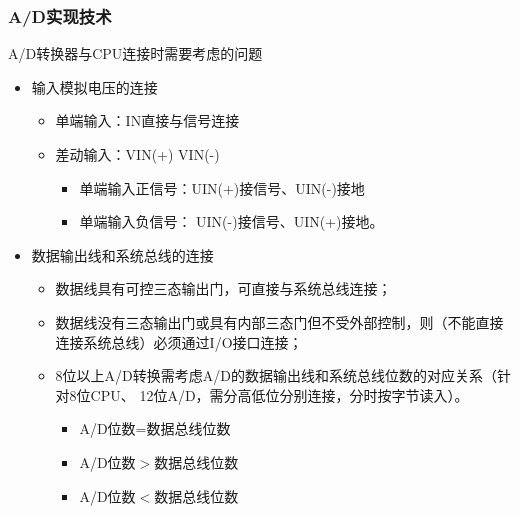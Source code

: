 \subsubsection{A/D实现技术}

A/D转换器与CPU连接时需要考虑的问题

\begin{itemize}
  \item 输入模拟电压的连接
  \begin{itemize}
    \item 单端输入：IN直接与信号连接
    \item 差动输入：VIN(+) VIN(-)
    \begin{itemize}
      \item 单端输入正信号：UIN(+)接信号、UIN(-)接地
      \item 单端输入负信号： UIN(-)接信号、UIN(+)接地。

    \end{itemize}



  \end{itemize}




  \item 数据输出线和系统总线的连接
  \begin{itemize}
    \item 数据线具有可控三态输出门，可直接与系统总线连接；

    \item 数据线没有三态输出门或具有内部三态门但不受外部控制，则（不能直接连接系统总线）必须通过I/O接口连接；

    \item 8位以上A/D转换需考虑A/D的数据输出线和系统总线位数的对应关系（针对8位CPU、 12位A/D，需分高低位分别连接，分时按字节读入）。

        \begin{itemize}
    \item A/D位数=数据总线位数
    \item 	A/D位数$>$数据总线位数

    \item A/D位数$<$数据总线位数

  \end{itemize}
\end{itemize}




\end{itemize}






